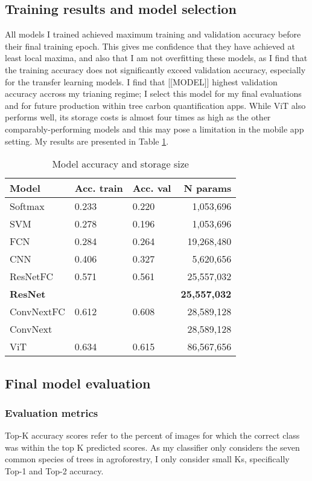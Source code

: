 \documentclass[10pt,twocolumn,letterpaper]{article}
\begin{document}
\subsection{Training results and model selection}
All models I trained achieved maximum training and validation accuracy before their final training epoch. This gives me confidence that they have achieved at least local maxima, and also that I am not overfitting these models, as I find that the training accuracy does not significantly exceed validation accuracy, especially for the transfer learning models.
I find that [[MODEL]] highest validation accuracy accross my trianing regime; I select this model for my final evaluations and for future production within tree carbon quantification apps. While ViT also performs well, its storage costs is almost four times as high as the other comparably-performing models and this may pose a limitation in the mobile app setting. My results are presented in Table \ref{tab:model_acc}.

\begin{table}[!htbp]
  \begin{center}
    \small
  \begin{tabular}{|l|l|l|r|}
  \hline
  Model & Acc. train & Acc. val & N params\\
  \hline\hline
  Softmax & 0.233 & 0.220 & 1,053,696 \\
  SVM & 0.278 & 0.196 & 1,053,696\\
  FCN & 0.284 & 0.264 & 19,268,480\\
  CNN & 0.406 & 0.327 & 5,620,656\\
  ResNetFC & 0.571 & 0.561 & 25,557,032\\
  \textbf{ResNet} & & & \textbf{25,557,032}\\
  ConvNextFC & 0.612 & 0.608 & 28,589,128\\
  ConvNext & & & 28,589,128\\
  ViT & 0.634 & 0.615 & 86,567,656\\
  \hline
  \end{tabular}
  \end{center}
  \caption{\label{tab:model_acc} Model accuracy and storage size}
  \end{table}

\subsection{Final model evaluation}
\subsubsection{Evaluation metrics}
Top-K accuracy scores refer to the percent of images for which the correct class was within the top K predicted scores. As my classifier only considers the seven common species of trees in agroforestry, I only consider small Ks, specifically Top-1 and Top-2 accuracy.
\end{document}
